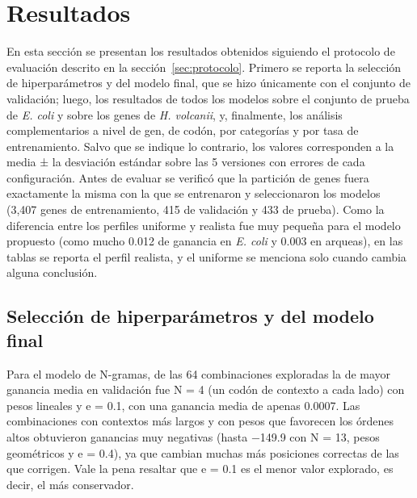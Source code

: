 \documentclass[sigconf,nonacm]{acmart}
\begin{document}
\section{Resultados}\label{sec:resultados}

En esta sección se presentan los resultados obtenidos siguiendo el protocolo de evaluación descrito en la sección~\ref{sec:protocolo}. Primero se reporta la selección de hiperparámetros y del modelo final, que se hizo únicamente con el conjunto de validación; luego, los resultados de todos los modelos sobre el conjunto de prueba de \emph{E. coli} y sobre los genes de \emph{H. volcanii}, y, finalmente, los análisis complementarios a nivel de gen, de codón, por categorías y por tasa de entrenamiento. Salvo que se indique lo contrario, los valores corresponden a la media ± la desviación estándar sobre las 5 versiones con errores de cada configuración. Antes de evaluar se verificó que la partición de genes fuera exactamente la misma con la que se entrenaron y seleccionaron los modelos (3,407 genes de entrenamiento, 415 de validación y 433 de prueba). Como la diferencia entre los perfiles uniforme y realista fue muy pequeña para el modelo propuesto (como mucho 0.012 de ganancia en \emph{E. coli} y 0.003 en arqueas), en las tablas se reporta el perfil realista, y el uniforme se menciona solo cuando cambia alguna conclusión.

\subsection{Selección de hiperparámetros y del modelo final}\label{sec:res-seleccion}

Para el modelo de N-gramas, de las 64 combinaciones exploradas la de mayor ganancia media en validación fue N = 4 (un codón de contexto a cada lado) con pesos lineales y e = 0.1, con una ganancia media de apenas 0.0007. Las combinaciones con contextos más largos y con pesos que favorecen los órdenes altos obtuvieron ganancias muy negativas (hasta −149.9 con N = 13, pesos geométricos y e = 0.4), ya que cambian muchas más posiciones correctas de las que corrigen. Vale la pena resaltar que e = 0.1 es el menor valor explorado, es decir, el más conservador.
\end{document}
